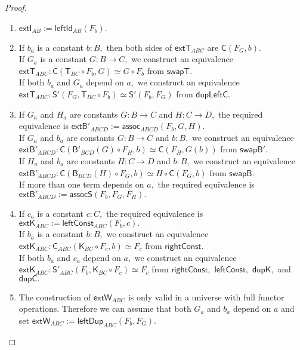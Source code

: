 \documentclass[a4paper]{article}
\theoremstyle{definition}
\theoremstyle{remark}
\renewcommand{\equiv}{\simeq}
\newcommand{\nm}{\mathsf}
\newcommand{\combinator}{\nm}
\newcommand{\revAppFun}{\combinator{T}}
\newcommand{\constFun}{\combinator{K}}
\newcommand{\compFun}{\combinator{B'}}
\newcommand{\revCompFun}{\combinator{B}}
\newcommand{\swapFun}{\combinator{C}}
\newcommand{\substFun}{\combinator{S'}}
\begin{document}
\begin{proof}
  \begin{enumerate}
    \item $\nm{extI}_{AB} := \nm{leftId}_{AB}(F_b).$
    \item If $b_a$ is a constant $b : B,$ then both sides of $\nm{extT}_{ABC}$ are
    $\swapFun(F_G,b).$\\
    If $G_a$ is a constant $G : B \to C,$ we construct an equivalence
    $\nm{extT}_{ABC} : \swapFun(\revAppFun_{BC} \circ F_b,G) \equiv G \circ F_b$
    from $\nm{swapT}.$\\
    If both $b_a$ and $G_a$ depend on $a,$ we construct an equivalence
    $\nm{extT}_{ABC} : \substFun(F_G,\revAppFun_{BC} \circ F_b) \equiv \substFun(F_b,F_G)$
    from $\nm{dupLeftC}.$
    \item If $G_a$ and $H_a$ are constants $G : B \to C$ and $H : C \to D,$ the required
    equivalence is $\nm{extB'}_{ABCD} := \nm{assoc}_{ABCD}(F_b,G,H).$\\
    If $G_a$ and $b_a$ are constants $G : B \to C$ and $b : B,$ we construct an equivalence
    $\nm{extB'}_{ABCD} : \swapFun(\compFun_{BCD}(G) \circ F_H,b) \equiv \swapFun(F_H,G(b))$
    from $\nm{swapB'}.$\\
    If $H_a$ and $b_a$ are constants $H : C \to D$ and $b : B,$ we construct an equivalence
    $\nm{extB'}_{ABCD} : \swapFun(\revCompFun_{BCD}(H) \circ F_G,b) \equiv H \circ \swapFun(F_G,b)$
    from $\nm{swapB}.$\\
    If more than one term depends on $a,$ the required equivalence is
    $\nm{extB'}_{ABCD} := \nm{assocS}(F_b,F_G,F_H).$
    \item If $c_a$ is a constant $c : C,$ the required equivalence is
    $\nm{extK}_{ABC} := \nm{leftConst}_{ABC}(F_b,c).$\\
    If $b_a$ is a constant $b : B,$ we construct an equivalence
    $\nm{extK}_{ABC} : \swapFun_{ABC}(\constFun_{BC} \circ F_c,b) \equiv F_c$ from
    $\nm{rightConst}.$\\
    If both $b_a$ and $c_a$ depend on $a,$ we construct an equivalence
    $\nm{extK}_{ABC} : \substFun_{ABC}(F_b,\constFun_{BC} \circ F_c) \equiv F_c$ from
    $\nm{rightConst},$ $\nm{leftConst},$ $\nm{dupK},$ and $\nm{dupC}.$
    \item The construction of $\nm{extW}_{ABC}$ is only valid in a universe with full
    functor operations. Therefore we can assume that both $G_a$ and $b_a$ depend on $a$
    and set $\nm{extW}_{ABC} := \nm{leftDup}_{ABC}(F_b,F_G).$
    \qedhere
  \end{enumerate}
\end{proof}
\end{document}
